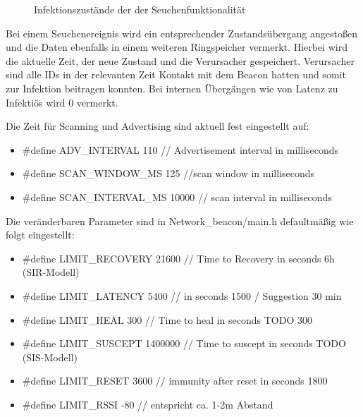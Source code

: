 \documentclass[11pt,ngerman]{scrartcl} %
\begin{document}
\begin{figure}[h]
\centering
{}
\caption{Infektionszustände der der Seuchenfunktionalität}
   \label{fig:statemachine}
\end{figure}

Bei einem Seuchenereignis wird ein entsprechender Zustandsübergang angestoßen und die Daten ebenfalls in einem weiteren Ringspeicher vermerkt. Hierbei wird die aktuelle Zeit, der neue Zustand und die Verursacher gespeichert. Verursacher sind alle IDs in der relevanten Zeit Kontakt mit dem Beacon hatten und somit zur Infektion beitragen konnten. Bei internen Übergängen wie von Latenz zu Infektiös wird 0 vermerkt.

Die Zeit für Scanning und Advertising sind aktuell fest eingestellt auf:
\begin{itemize}
\item \#define ADV\_INTERVAL				110 // Advertisement interval in milliseconds
\item \#define SCAN\_WINDOW\_MS				125  //scan window in milliseconds
\item \#define SCAN\_INTERVAL\_MS			10000  // scan interval in milliseconds
\end{itemize}


Die veränderbaren Parameter sind in Network\_beacon/main.h defaultmäßig wie folgt eingestellt:
\begin{itemize}
\item \#define LIMIT\_RECOVERY				21600 // Time to Recovery in seconds     6h (SIR-Modell)
\item \#define LIMIT\_LATENCY				5400 //  in seconds 1500  / Suggestion 30 min
\item \#define LIMIT\_HEAL					300 // Time to heal in seconds TODO 300
\item \#define LIMIT\_SUSCEPT				1400000 // Time to suscept in seconds TODO (SIS-Modell)
\item \#define LIMIT\_RESET					3600 // immunity after reset in seconds 1800
\item \#define LIMIT\_RSSI		 			-80 // entspricht ca. 1-2m Abstand
\end{itemize}
\end{document}
